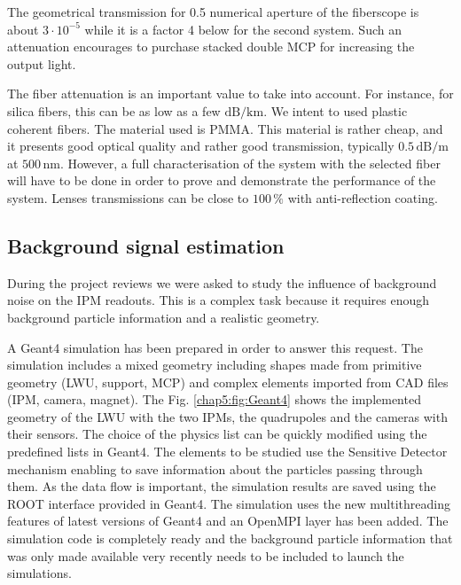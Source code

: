 The geometrical transmission for 0.5 numerical aperture of the fiberscope is about $3 \cdot 10^{-5}$ while it is a factor 4 below for the second system. Such an attenuation encourages to purchase stacked double MCP for increasing the output light.

The fiber attenuation is an important value to take into account. For instance, for silica fibers, this can be as low as a few $\mathrm{dB/km}$. We intent to used plastic coherent fibers. The material used is PMMA. This material is rather cheap, and it presents good optical quality and rather good transmission, typically $0.5\,\mathrm{dB/m}$ at $500\,\mathrm{nm}$. However, a full characterisation of the system with the selected fiber will have to be done in order to prove and demonstrate the performance of the system. Lenses transmissions can be close to $100\,\mathrm{\%}$ with anti-reflection coating.

\subsection*{Background signal estimation}

During the project reviews we were asked to study the influence of background noise on the IPM readouts. This is a complex task because it requires enough background particle information  and a realistic geometry.


A Geant4 simulation has been prepared in order to answer this request. The simulation includes a mixed geometry including shapes made from primitive geometry (LWU, support, MCP) and complex elements imported from CAD files (IPM, camera, magnet). The Fig. \ref{chap5:fig:Geant4} shows the implemented geometry of the LWU with the two IPMs, the quadrupoles and the cameras with their sensors. The choice of the physics list can be quickly modified using the predefined lists in Geant4. The elements to be studied use the Sensitive Detector mechanism enabling to save information about the particles passing through them. As the data flow is important, the simulation results are saved using the ROOT interface provided in Geant4. The simulation uses the new multithreading features of latest versions of Geant4 and an OpenMPI layer has been added. The simulation code is completely ready and the background particle information that was only made available very recently needs to be included to launch the simulations.


